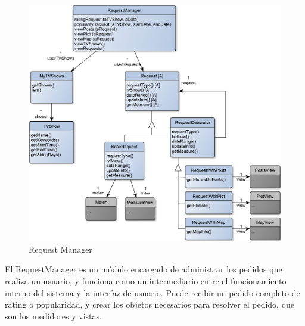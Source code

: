 \begin{figure}[H]
\centering
\includegraphics[width=\textwidth]{graph/clase/request.pdf}
\caption{Request Manager}
\end{figure}

El RequestManager es un módulo encargado de administrar los pedidos que realiza un usuario, y funciona como un intermediario entre el funcionamiento interno del sistema y la interfaz de usuario. Puede recibir un pedido completo de rating o popularidad, y crear los objetos necesarios para resolver el pedido, que son los medidores y vistas.



